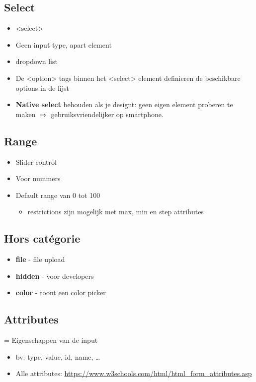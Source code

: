 \documentclass{article}
\newcommand{\bold}[1]{\textbf{#1}}
\begin{document}
\subsection{Select}
\begin{itemize}
    \item <select>
    \item Geen input type, apart element
    \item dropdown list
    \item De <option> tags binnen het <select> element definieren de beschikbare options in de lijst
    \item \bold{Native select} behouden als je designt: geen eigen element proberen te maken $\Rightarrow$ gebruiksvriendelijker op smartphone.
\end{itemize}

\subsection{Range}
\begin{itemize}
    \item Slider control
    \item Voor nummers
    \item Default range van 0 tot 100
    \begin{itemize}
        \item restrictions zijn mogelijk met max, min en step attributes
    \end{itemize}
\end{itemize}

\subsection{Hors catégorie}
\begin{itemize}
    \item \bold{file} - file upload
    \item \bold{hidden} - voor developers
    \item \bold{color} - toont een color picker
\end{itemize}


\subsection{Attributes}
= Eigenschappen van de input

\begin{itemize}
    \item bv: type, value, id, name, \dots
    \item Alle attributes: \url{https://www.w3schools.com/html/html_form_attributes.asp}
\end{itemize}
\end{document}
